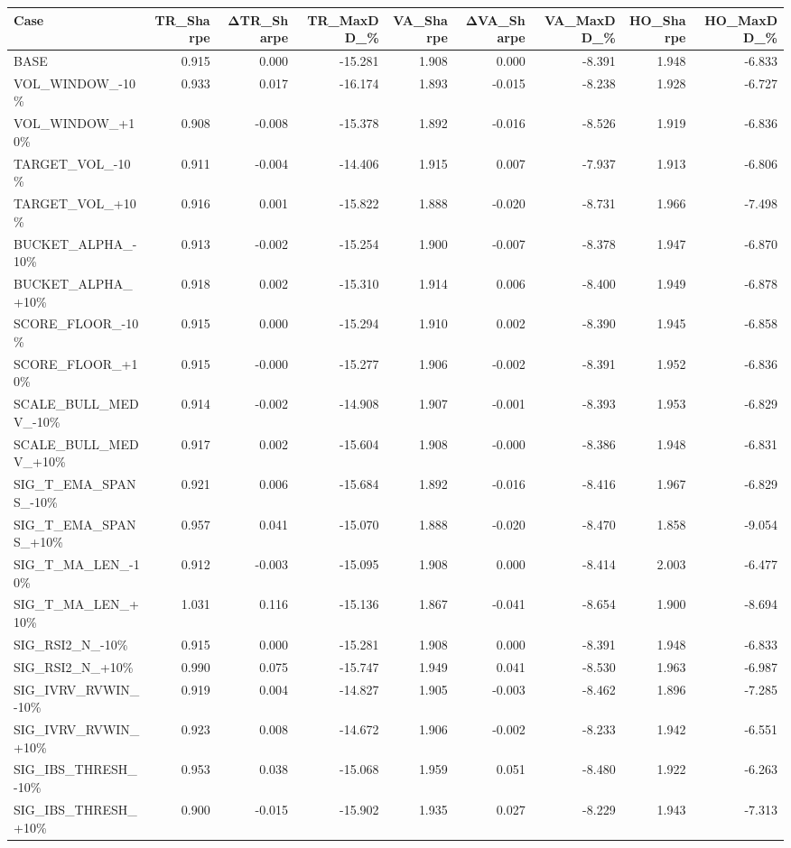 \begin{tabular}{lrrrrrrrr}
\toprule
Case & TR\_Sharpe & ΔTR\_Sharpe & TR\_MaxDD\_\% & VA\_Sharpe & ΔVA\_Sharpe & VA\_MaxDD\_\% & HO\_Sharpe & HO\_MaxDD\_\% \\
\midrule
BASE & 0.915 & 0.000 & -15.281 & 1.908 & 0.000 & -8.391 & 1.948 & -6.833 \\
VOL\_WINDOW\_-10\% & 0.933 & 0.017 & -16.174 & 1.893 & -0.015 & -8.238 & 1.928 & -6.727 \\
VOL\_WINDOW\_+10\% & 0.908 & -0.008 & -15.378 & 1.892 & -0.016 & -8.526 & 1.919 & -6.836 \\
TARGET\_VOL\_-10\% & 0.911 & -0.004 & -14.406 & 1.915 & 0.007 & -7.937 & 1.913 & -6.806 \\
TARGET\_VOL\_+10\% & 0.916 & 0.001 & -15.822 & 1.888 & -0.020 & -8.731 & 1.966 & -7.498 \\
BUCKET\_ALPHA\_-10\% & 0.913 & -0.002 & -15.254 & 1.900 & -0.007 & -8.378 & 1.947 & -6.870 \\
BUCKET\_ALPHA\_+10\% & 0.918 & 0.002 & -15.310 & 1.914 & 0.006 & -8.400 & 1.949 & -6.878 \\
SCORE\_FLOOR\_-10\% & 0.915 & 0.000 & -15.294 & 1.910 & 0.002 & -8.390 & 1.945 & -6.858 \\
SCORE\_FLOOR\_+10\% & 0.915 & -0.000 & -15.277 & 1.906 & -0.002 & -8.391 & 1.952 & -6.836 \\
SCALE\_BULL\_MEDV\_-10\% & 0.914 & -0.002 & -14.908 & 1.907 & -0.001 & -8.393 & 1.953 & -6.829 \\
SCALE\_BULL\_MEDV\_+10\% & 0.917 & 0.002 & -15.604 & 1.908 & -0.000 & -8.386 & 1.948 & -6.831 \\
SIG\_T\_EMA\_SPANS\_-10\% & 0.921 & 0.006 & -15.684 & 1.892 & -0.016 & -8.416 & 1.967 & -6.829 \\
SIG\_T\_EMA\_SPANS\_+10\% & 0.957 & 0.041 & -15.070 & 1.888 & -0.020 & -8.470 & 1.858 & -9.054 \\
SIG\_T\_MA\_LEN\_-10\% & 0.912 & -0.003 & -15.095 & 1.908 & 0.000 & -8.414 & 2.003 & -6.477 \\
SIG\_T\_MA\_LEN\_+10\% & 1.031 & 0.116 & -15.136 & 1.867 & -0.041 & -8.654 & 1.900 & -8.694 \\
SIG\_RSI2\_N\_-10\% & 0.915 & 0.000 & -15.281 & 1.908 & 0.000 & -8.391 & 1.948 & -6.833 \\
SIG\_RSI2\_N\_+10\% & 0.990 & 0.075 & -15.747 & 1.949 & 0.041 & -8.530 & 1.963 & -6.987 \\
SIG\_IVRV\_RVWIN\_-10\% & 0.919 & 0.004 & -14.827 & 1.905 & -0.003 & -8.462 & 1.896 & -7.285 \\
SIG\_IVRV\_RVWIN\_+10\% & 0.923 & 0.008 & -14.672 & 1.906 & -0.002 & -8.233 & 1.942 & -6.551 \\
SIG\_IBS\_THRESH\_-10\% & 0.953 & 0.038 & -15.068 & 1.959 & 0.051 & -8.480 & 1.922 & -6.263 \\
SIG\_IBS\_THRESH\_+10\% & 0.900 & -0.015 & -15.902 & 1.935 & 0.027 & -8.229 & 1.943 & -7.313 \\
\bottomrule
\end{tabular}
